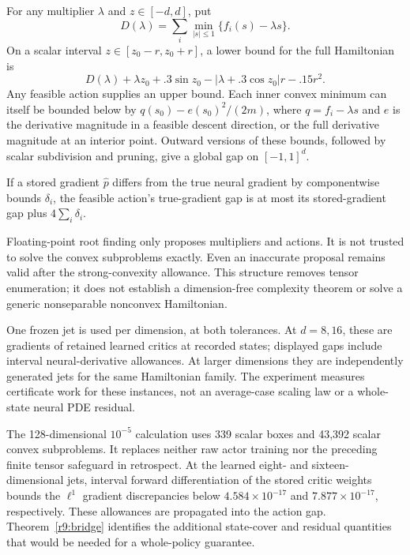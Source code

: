 \begin{theorem}\label{r9:actionthm}
For any multiplier $\lambda$ and $z\in[-d,d]$, put
\[
 D(\lambda)=\sum_i\min_{|s|\leq1}\{f_i(s)-\lambda s\}.
\]
On a scalar interval $z\in[z_0-r,z_0+r]$, a lower bound for the full Hamiltonian is
\begin{equation}
 D(\lambda)+\lambda z_0+.3\sin z_0
       -|\lambda+.3\cos z_0|r-.15r^2.\label{r9:actionlower}
\end{equation}
Any feasible action supplies an upper bound. Each inner convex minimum can itself be bounded below by $q(s_0)-e(s_0)^2/(2m)$, where $q=f_i-\lambda s$ and $e$ is the derivative magnitude in a feasible descent direction, or the full derivative magnitude at an interior point. Outward versions of these bounds, followed by scalar subdivision and pruning, give a global gap on $[-1,1]^d$.

If a stored gradient $\widehat p$ differs from the true neural gradient by componentwise bounds $\delta_i$, the feasible action's true-gradient gap is at most its stored-gradient gap plus $4\sum_i\delta_i$.
\end{theorem}
Floating-point root finding only proposes multipliers and actions. It is not trusted to solve the convex subproblems exactly. Even an inaccurate proposal remains valid after the strong-convexity allowance. This structure removes tensor enumeration; it does not establish a dimension-free complexity theorem or solve a generic nonseparable nonconvex Hamiltonian.

\begin{table}[t]
\centering\small
\caption{Executed continuous-action certificates}\label{r9:tab:action}

\par\smallskip\footnotesize One frozen jet is used per dimension, at both tolerances. At $d=8,16$, these are gradients of retained learned critics at recorded states; displayed gaps include interval neural-derivative allowances. At larger dimensions they are independently generated jets for the same Hamiltonian family. The experiment measures certificate work for these instances, not an average-case scaling law or a whole-state neural PDE residual.
\end{table}

The 128-dimensional $10^{-5}$ calculation uses 339 scalar boxes and 43,392 scalar convex subproblems. It replaces neither raw actor training nor the preceding finite tensor safeguard in retrospect. At the learned eight- and sixteen-dimensional jets, interval forward differentiation of the stored critic weights bounds the $\ell^1$ gradient discrepancies below $4.584\times10^{-17}$ and $7.877\times10^{-17}$, respectively. These allowances are propagated into the action gap. Theorem~\ref{r9:bridge} identifies the additional state-cover and residual quantities that would be needed for a whole-policy guarantee.

